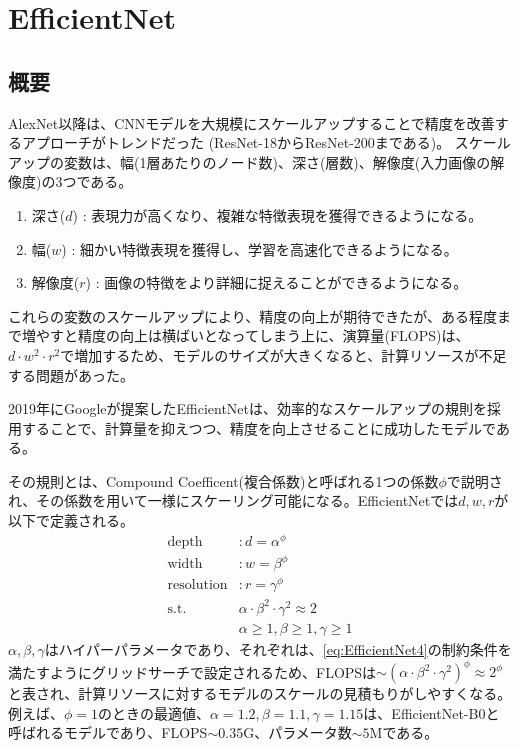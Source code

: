 \documentclass{ltjsarticle}
\begin{document}
\clearpage
\section{EfficientNet}
\subsection{概要}
AlexNet以降は、CNNモデルを大規模にスケールアップすることで精度を改善するアプローチがトレンドだった (ResNet-18からResNet-200まである)。
スケールアップの変数は、幅(1層あたりのノード数)、深さ(層数)、解像度(入力画像の解像度)の3つである。
\begin{enumerate}
  \item 深さ($d$) : 表現力が高くなり、複雑な特徴表現を獲得できるようになる。
  \item 幅($w$) : 細かい特徴表現を獲得し、学習を高速化できるようになる。
  \item 解像度($r$) : 画像の特徴をより詳細に捉えることができるようになる。
\end{enumerate}
これらの変数のスケールアップにより、精度の向上が期待できたが、ある程度まで増やすと精度の向上は横ばいとなってしまう上に、演算量(FLOPS)は、$d\cdot w^2 \cdot r^2$で増加するため、モデルのサイズが大きくなると、計算リソースが不足する問題があった。
\par
2019年にGoogleが提案したEfficientNetは、効率的なスケールアップの規則を採用することで、計算量を抑えつつ、精度を向上させることに成功したモデルである。
\par
その規則とは、Compound Coefficent(複合係数)と呼ばれる1つの係数$\phi$で説明され、その係数を用いて一様にスケーリング可能になる。EfficientNetでは$d, w, r$が以下で定義される。
\begin{align}
  \text{depth} &: d = \alpha^{\phi} \\
  \text{width} &: w = \beta^{\phi} \\
  \text{resolution} &: r = \gamma^{\phi}\\
  \label{eq:EfficientNet4}
  \text{s.t. }  & \alpha \cdot \beta^2 \cdot \gamma^2 \approx 2 \\
  & \alpha \geq 1, \beta \geq 1, \gamma \geq 1
\end{align}
$\alpha, \beta, \gamma$はハイパーパラメータであり、それぞれは、\eqref{eq:EfficientNet4}の制約条件を満たすようにグリッドサーチで設定されるため、FLOPSは$\sim (\alpha \cdot \beta^2 \cdot \gamma^2)^{\phi} \approx 2^{\phi}$ と表され、計算リソースに対するモデルのスケールの見積もりがしやすくなる。例えば、$\phi=1$のときの最適値、$\alpha=1.2, \beta=1.1, \gamma=1.15$は、EfficientNet-B0と呼ばれるモデルであり、FLOPS$\sim 0.35$G、パラメータ数$\sim 5$Mである。
\end{document}
